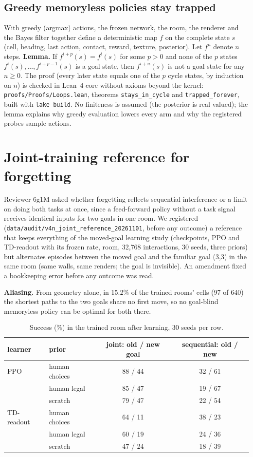 \documentclass[10pt,onecolumn,letterpaper]{article}
\begin{document}
\subsection{Greedy memoryless policies stay trapped}
\label{sec:lean}
With greedy (argmax) actions, the frozen network, the room, the renderer and the Bayes filter together define a
deterministic map $f$ on the complete state $s$ (cell, heading, last action, contact, reward, texture, posterior).
Let $f^{n}$ denote $n$ steps. \textbf{Lemma.} If $f^{i+p}(s)=f^{i}(s)$ for some $p>0$ and none of the $p$ states
$f^{i}(s),\dots,f^{i+p-1}(s)$ is a goal state, then $f^{i+n}(s)$ is not a goal state for any $n\ge0$.
The proof (every later state equals one of the $p$ cycle states, by induction on $n$) is checked in Lean~4 core
without axioms beyond the kernel: \texttt{proofs/Proofs/Loops.lean}, theorems \texttt{stays\_in\_cycle} and
\texttt{trapped\_forever}, built with \texttt{lake build}. No finiteness is assumed (the posterior is real-valued);
the lemma explains why greedy evaluation lowers every arm and why the registered probes sample actions.


\section{Joint-training reference for forgetting}
\label{sec:joint}
Reviewer 6g1M asked whether forgetting reflects sequential interference or a limit on doing both tasks at once, since a
feed-forward policy without a task signal receives identical inputs for two goals in one room. We registered
(\texttt{data/audit/v4n\_joint\_reference\_20261101}, before any outcome) a reference that keeps everything of the
moved-goal learning study (checkpoints, PPO and TD-readout with its frozen rate, room, 32,768 interactions, 30 seeds,
three priors) but alternates episodes between the moved goal and the familiar goal (3,3) in the same room (same walls,
same renders; the goal is invisible). An amendment fixed a bookkeeping error before any outcome was read.

\textbf{Aliasing.} From geometry alone, in 15.2\% of the trained rooms' cells (97 of 640) the shortest paths to the two
goals share no first move, so no goal-blind memoryless policy can be optimal for both there.

\begin{table}[h]\centering\small\setlength{\tabcolsep}{3pt}
\begin{tabular}{@{}llcc@{}}\toprule
learner & prior & joint: old / new goal & sequential: old / new\\\midrule
PPO & human choices & 88 / 44 & 32 / 61\\
 & human legal & 85 / 47 & 19 / 67\\
 & scratch & 79 / 47 & 22 / 54\\
TD-readout & human choices & 64 / 11 & 38 / 23\\
 & human legal & 60 / 19 & 24 / 36\\
 & scratch & 47 / 24 & 18 / 39\\\bottomrule
\end{tabular}
\caption{Success (\%) in the trained room after learning, 30 seeds per row.}\label{tab:joint}\end{table}
\end{document}
